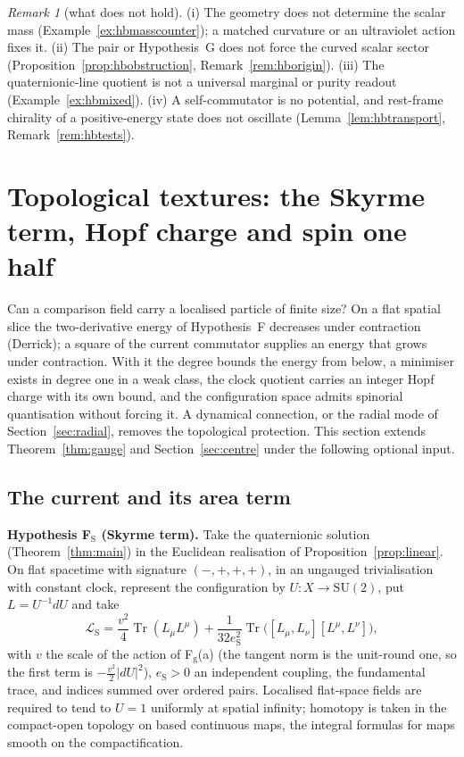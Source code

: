 \documentclass[aps,pra,onecolumn,superscriptaddress,nofootinbib,10pt]{revtex4-2}
\theoremstyle{definition}
\theoremstyle{remark}
\newtheorem{remark}[theorem]{Remark}
\newcommand{\tr}{\operatorname{Tr}}
\newcommand{\SU}{\mathrm{SU}}
\begin{document}
\begin{remark}[what does not hold]\label{rem:hbnogo}
(i) The geometry does not determine the scalar mass (Example~\ref{ex:hbmasscounter}); a matched curvature or an
ultraviolet action fixes it.  (ii) The pair or Hypothesis~G does not force the curved scalar sector
(Proposition~\ref{prop:hbobstruction}, Remark~\ref{rem:hborigin}).  (iii) The quaternionic-line quotient is not a universal
marginal or purity readout (Example~\ref{ex:hbmixed}).  (iv) A self-commutator is no potential, and rest-frame
chirality of a positive-energy state does not oscillate (Lemma~\ref{lem:hbtransport}, Remark~\ref{rem:hbtests}).
\end{remark}

\section{Topological textures: the Skyrme term, Hopf charge and spin one half}\label{sec:skyrme}
Can a comparison field carry a localised particle of finite size?  On a flat spatial slice the
two-derivative energy of Hypothesis~F decreases under contraction (Derrick); a square of the current
commutator supplies an energy that grows under contraction.  With it the degree bounds the energy
from below, a minimiser exists in degree one in a weak class, the clock quotient carries an integer
Hopf charge with its own bound, and the configuration space admits spinorial quantisation without
forcing it.  A dynamical connection, or the radial mode of Section~\ref{sec:radial}, removes the
topological protection.  This section extends Theorem~\ref{thm:gauge} and Section~\ref{sec:centre} under the following
optional input.

\subsection{The current and its area term}

\smallskip\noindent\textbf{Hypothesis F$_{\mathrm S}$ (Skyrme term).}\label{hyp:FS}  Take the quaternionic solution (Theorem~\ref{thm:main}) in
the Euclidean realisation of Proposition~\ref{prop:linear}.  On flat spacetime with signature $(-,+,+,+)$, in an
ungauged trivialisation with constant clock, represent the configuration by $U\colon X\to\SU(2)$, put
$L=U^{-1}dU$ and take
\begin{equation}\label{eq:skyrmeaction}
\mathcal L_{\mathrm S}=\frac{v^2}{4}\tr(L_\mu L^\mu)+\frac1{32e_{\mathrm S}^2}\tr\bigl([L_\mu,L_\nu][L^\mu,L^\nu]\bigr),
\end{equation}
with $v$ the scale of the action of F$_{\mathrm g}$(a) (the tangent norm is the unit-round one, so the first term is
$-\tfrac{v^2}2\lvert dU\rvert^2$), $e_{\mathrm S}>0$ an independent coupling, the fundamental trace, and indices summed over ordered
pairs.  Localised flat-space fields are required to tend to $U=1$ uniformly at spatial infinity; homotopy
is taken in the compact-open topology on based continuous maps, the integral formulas for maps smooth
on the compactification.
\end{document}
